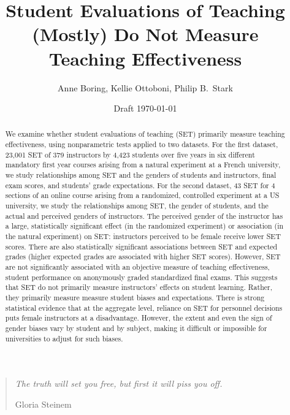 \documentclass[12pt]{article}
\title{Student Evaluations of Teaching (Mostly) Do Not Measure Teaching Effectiveness}
\author{Anne Boring, Kellie Ottoboni, Philip B.~Stark}
\date{Draft \today}
\begin{document}
\maketitle

\newpage
\begin{quotation}
    \emph{The truth will set you free, but first it will piss you off.}
    
     \hfill Gloria Steinem

\begin{abstract}

We examine whether student evaluations of teaching (SET) 
primarily measure teaching effectiveness, using nonparametric tests applied
to two datasets. 
For the first dataset, 23,001 SET of 379 instructors by 4,423 students over five years in six different mandatory first year courses arising from a natural experiment at a French university, 
we study relationships among SET and the genders of students and instructors, final exam scores, and students' grade expectations. 
For the second dataset, 43 SET for 4 sections of an online course arising from a randomized, controlled experiment at a US university, 
we study the relationships among SET, the gender of students, and the actual and perceived genders of instructors. 
The perceived gender of the instructor has a large, statistically significant effect 
(in the randomized experiment)
or association (in the natural experiment) on 
SET: instructors perceived to be female receive lower SET scores.
There are also statistically significant associations between SET and expected grades 
(higher expected grades are associated with higher SET scores). 
However, SET are not significantly associated with an objective measure of teaching effectiveness,
student performance on anonymously graded standardized final exams. 
This suggests that SET do not primarily measure instructors' 
effects on student learning. 
Rather, they primarily measure measure student biases and expectations.
There is strong statistical evidence that at the aggregate level, reliance on SET for 
personnel decisions puts female instructors at a disadvantage.
However, the extent and even the sign of gender biases vary by student and by subject, making it 
difficult or impossible for universities to adjust for such biases. 


\end{abstract}
\end{quotation}
\end{document}
